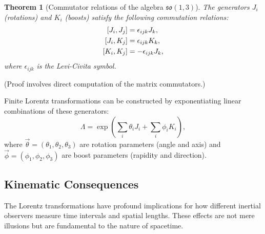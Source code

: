 \documentclass{amsart}
\newtheorem{theorem}{Theorem}[section]
\theoremstyle{definition}
\theoremstyle{remark}
\begin{document}
\begin{theorem}[Commutator relations of the algebra $\mathfrak{so}(1,3)$]\label{thm:so13_algebra_commutation_relations}
  The generators $J_i$ (rotations) and $K_i$ (boosts) satisfy the following commutation relations:
  \[
  \begin{aligned}
    \relax [J_i, J_j] &= \epsilon_{ijk} J_k, \\
    \relax [J_i, K_j] &= \epsilon_{ijk} K_k, \\
    \relax [K_i, K_j] &= -\epsilon_{ijk} J_k,
  \end{aligned}
  \]
  where $\epsilon_{ijk}$ is the Levi-Civita symbol.
\end{theorem}
(Proof involves direct computation of the matrix commutators.)

Finite Lorentz transformations can be constructed by exponentiating linear combinations of these generators:
\[
\Lambda = \exp\left(\sum_i \theta_i J_i + \sum_i \phi_i K_i \right),
\]
where $\vec{\theta} = (\theta_1, \theta_2, \theta_3)$ are rotation parameters (angle and axis) and $\vec{\phi} = (\phi_1, \phi_2, \phi_3)$ are boost parameters (rapidity and direction).

\subsection{Kinematic Consequences}
\label{subsec:sr_kinematics}
The Lorentz transformations have profound implications for how different inertial observers measure time intervals and spatial lengths. These effects are not mere illusions but are fundamental to the nature of spacetime.
\end{document}
